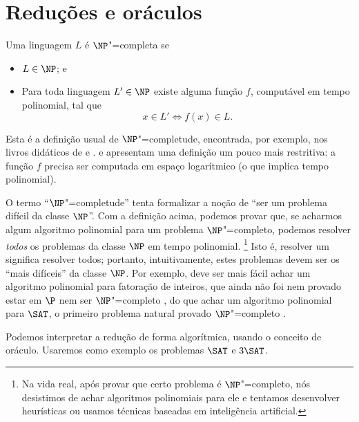 \section{Reduções e oráculos}
\label{sec:oracles_and_reductions}

\begin{definition}[$\NP$"=completude]
    Uma linguagem $L$ é $\NP$"=completa se
    \begin{itemize}
        \item $L \in \NP$; e
        \item Para toda linguagem $L' \in \NP$ existe alguma função $f$,
            computável em tempo polinomial,
            tal que
            \begin{equation*}
                x \in L' \iff f(x) \in L.
            \end{equation*}
    \end{itemize}
\end{definition}

Esta é a definição usual de $\NP$"=completude,
encontrada, por exemplo,
nos livros didáticos de 
e .
 e 
apresentam uma definição um pouco mais restritiva:
a função $f$ precisa ser computada em espaço logarítmico
(o que implica tempo polinomial).

O termo ``$\NP$"=completude'' tenta formalizar a noção de
``ser um problema difícil da classe $\NP$''.
Com a definição acima,
podemos provar que,
se acharmos algum algoritmo polinomial para um problema $\NP$"=completo,
podemos resolver \emph{todos} os problemas da classe $\NP$ em tempo polinomial.%
\footnote{
    Na vida real,
    após provar que certo problema é $\NP$"=completo,
    nós desistimos de achar algoritmos polinomiais para ele
    e tentamos desenvolver heurísticas
    ou usamos técnicas baseadas em inteligência artificial.
}
Isto é,
resolver um significa resolver todos;
portanto,
intuitivamente,
estes problemas devem ser os ``mais difíceis'' da classe $\NP$.
Por exemplo,
deve ser mais fácil achar um algoritmo polinomial para fatoração de inteiros,
que ainda não foi nem provado estar em $\P$
nem ser $\NP$"=completo \cite[p.~120]{DuKo2014},
do que achar um algoritmo polinomial para $\SAT$,
o primeiro problema natural provado $\NP$"=completo \cite[p.~80]{DuKo2014}.

Podemos interpretar a redução de forma algorítmica,
usando o conceito de oráculo.
Usaremos como exemplo os problemas $\SAT$ e $3\SAT$.

